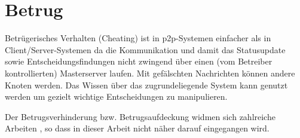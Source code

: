 



\section{Betrug}
Betrügerisches Verhalten (Cheating) ist in p2p-Systemen einfacher als in Client/Server-Systemen da die Kommunikation und damit das Statusupdate sowie Entscheidungsfindungen nicht zwingend über einen (vom Betreiber kontrollierten) Masterserver laufen. Mit gefälschten Nachrichten können andere Knoten werden. Das Wissen über das zugrundeliegende System kann genutzt werden um gezielt wichtige Entscheidungen zu manipulieren.

Der Betrugsverhinderung bzw. Betrugsaufdeckung widmen sich zahlreiche Arbeiten \cite{citeulike:4243521, citeulike:499803, citeulike:3196934, citeulike:4243572, citeulike:6643788}, so dass in dieser Arbeit nicht näher darauf eingegangen wird.
